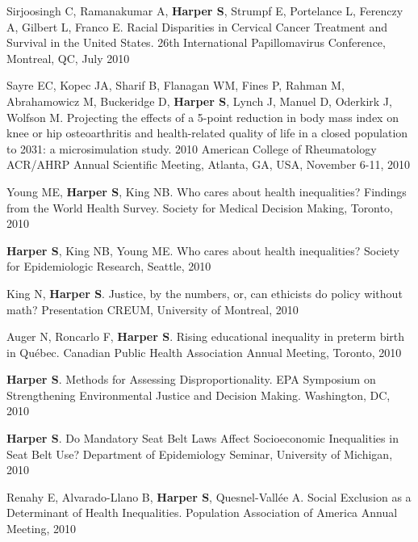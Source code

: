 \documentclass[
  letterpaper,
  DIV=11,
  numbers=noendperiod]{scrartcl}
\begin{document}
\begin{etaremune}
\item   Sirjoosingh C, Ramanakumar A, \textbf{Harper S}, Strumpf E, Portelance L, Ferenczy A, Gilbert L, Franco E. Racial Disparities in Cervical Cancer Treatment and Survival in the United States. 26th International Papillomavirus Conference, Montreal, QC, July 2010

\item   Sayre EC, Kopec JA, Sharif B, Flanagan WM, Fines P, Rahman M, Abrahamowicz M, Buckeridge D, \textbf{Harper S}, Lynch J, Manuel D, Oderkirk J, Wolfson M. Projecting the effects of a 5-point reduction in body mass index on knee or hip osteoarthritis and health-related quality of life in a closed population to 2031: a microsimulation study. 2010 American College of Rheumatology ACR/AHRP Annual Scientific Meeting, Atlanta, GA, USA, November 6-11, 2010

\item   Young ME, \textbf{Harper S}, King NB. Who cares about health inequalities? Findings from the World Health Survey. Society for Medical Decision Making, Toronto, 2010

\item   \textbf{Harper S}, King NB, Young ME. Who cares about health inequalities? Society for Epidemiologic Research, Seattle, 2010

\item   King N, \textbf{Harper S}. Justice, by the numbers, or, can ethicists do policy without math? Presentation CREUM, University of Montreal, 2010

\item   Auger N, Roncarlo F, \textbf{Harper S}. Rising educational inequality in preterm birth in Québec. Canadian Public Health Association Annual Meeting, Toronto, 2010

\item   \textbf{Harper S}. Methods for Assessing Disproportionality. EPA Symposium on Strengthening Environmental Justice and Decision Making. Washington, DC, 2010

\item \textbf{Harper S}. Do Mandatory Seat Belt Laws Affect Socioeconomic Inequalities in Seat Belt Use? Department of Epidemiology Seminar, University of Michigan, 2010

\item Renahy E, Alvarado-Llano B, \textbf{Harper S}, Quesnel-Vallée A. Social Exclusion as a Determinant of Health Inequalities. Population Association of America Annual Meeting, 2010


\end{etaremune}
\end{document}
